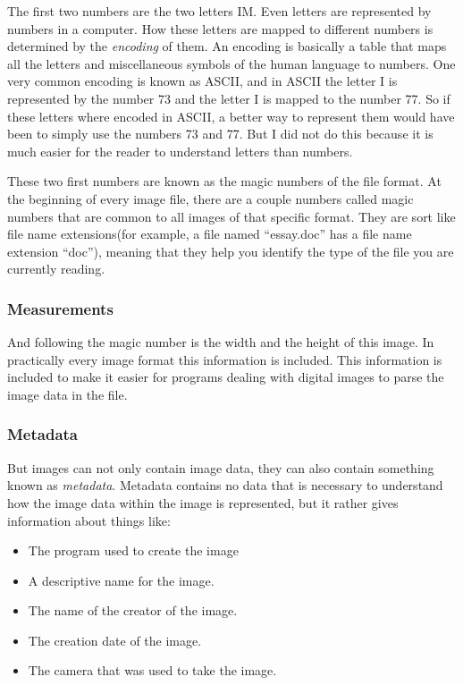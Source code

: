 The first two numbers are the two letters IM. Even letters are
represented by numbers in a computer. How these letters are mapped to
different numbers is determined by the \textit{encoding} of them. An
encoding is basically a table that maps all the letters and
miscellaneous symbols of the human language to numbers. One very
common encoding is known as ASCII, and in ASCII the letter I is
represented by the number 73 and the letter I is mapped to the number
77. So if these letters where encoded in ASCII, a better way to
represent them would have been to simply use the numbers 73 and
77. But I did not do this because it is much easier for the reader to
understand letters than numbers.

These two first numbers are known as the magic numbers of the file
format. At the beginning of every image file, there are a couple
numbers called magic numbers that are common to all images of that
specific format. They are sort like file name extensions(for example,
a file named ``essay.doc'' has a file name extension ``doc''), meaning
that they help you identify the type of the file you are currently
reading.

\subsubsection{Measurements}

And following the magic number is the width and the height of this
image. In practically every image format this information is
included. This information is included to make it easier for programs
dealing with digital images to parse the image data in the file.

\subsubsection{Metadata}

But images can not only contain image data, they can also contain
something known as \textit{metadata}. Metadata contains no data that
is necessary to understand how the image data within the image is
represented, but it rather gives information about things like:

\begin{itemize}
\item The program used to create the image
\item A descriptive name for the image.
\item The name of the creator of the image.
\item The creation date of the image.
\item The camera that was used to take the image.
\end{itemize}

